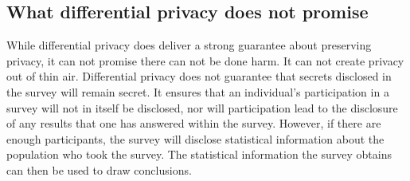 \documentclass[11pt]{article}
\theoremstyle{definition}
\begin{document}


\subsection{What differential privacy does not promise}
While differential privacy does deliver a strong guarantee about preserving privacy, it can not promise there can not be done harm. It can not create privacy out of thin air. Differential privacy does not guarantee that secrets disclosed in the survey will remain secret. It ensures that an individual's participation in a survey will not in itself be disclosed, nor will participation lead to the disclosure of any results that one has answered within the survey. However, if there are enough participants, the survey will disclose statistical information about the population who took the survey. The statistical information the survey obtains can then be used to draw conclusions.
\end{document}
